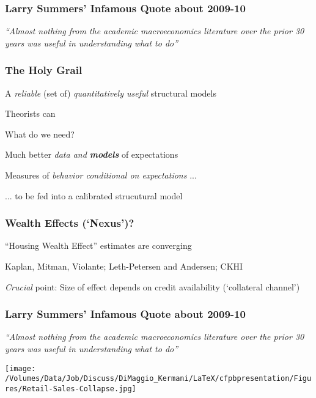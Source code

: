 \begin{frame}\frametitle{Larry Summers' Infamous Quote about 2009-10}

{\it ``Almost nothing from the academic macroeconomics literature over the prior
30 years was useful in understanding what to do''}


\begin{center}
\end{center}

\end{frame}


\begin{frame}\frametitle{The Holy Grail}

\bi
\item A {\it reliable} (set of) {\it quantitatively useful} structural models
\bi
\item Theorists can
\ei
\item What do we need?
\bi
\item Much better {\it data and  {\bf models}} of expectations
\item Measures of {\it behavior conditional on expectations} ...
\item ... to be fed into a calibrated strucutural model
\ei
\ei

\end{frame}

\begin{frame}\frametitle{Wealth Effects (`Nexus')?}
\bi
\item ``Housing Wealth Effect'' estimates are converging
\item Kaplan, Mitman, Violante; Leth-Petersen and Andersen; CKHI
\item {\it Crucial} point: Size of effect depends on credit availability (`collateral channel')
\ei
\end{frame}


\begin{frame}\frametitle{Larry Summers' Infamous Quote about 2009-10}

{\it ``Almost nothing from the academic macroeconomics literature over the prior
30 years was useful in understanding what to do''}

\begin{center}
\texttt{[image: /Volumes/Data/Job/Discuss/DiMaggio\_Kermani/LaTeX/cfpbpresentation/Figures/Retail-Sales-Collapse.jpg]}
\end{center}

\end{frame}

